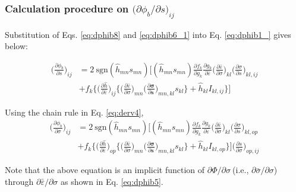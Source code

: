 \documentclass[12pt]{amsart}
\begin{document}
\subsubsection{Calculation procedure on $\big(\partial\phi_b/\partial s\big)_{ij}$}
\label{sec:calc}


Substitution of Eqs. \ref{eq:dphib8} and \ref{eq:dphib6_1} into Eq. \ref{eq:dphib1_} gives below:

\begin{equation}
  \label{eq:dphib_main}
  \begin{split}
    \bigg(\frac{\partial\phi_b}{\partial s}\bigg)_{ij} &= 2\ \text{sgn}(\hat{h}_{mn}s_{mn}) \bigg[(\hat{h}_{mn}s_{mn})
    \frac{\partial f_k}{\partial g_k} \frac{\partial g_k}{\partial \bar{\varepsilon}}
    \bigg(\frac{\partial\bar{\varepsilon}}{\partial\sigma}\bigg)_{kl}
    \bigg(\frac{\partial\sigma}{\partial s}\bigg)_{kl,ij} \\
    &+ f_k\bigg\{
    \bigg(\frac{\partial\hat{h}}{\partial\bar{\varepsilon}}\bigg)_{ij} \bigg\{\bigg(\frac{\partial\bar{\varepsilon}}{\partial\sigma}\bigg)_{mn}  \bigg(\frac{\partial{\mathbf{\sigma}}}{\partial{\mathbf{s}}}\bigg)_{mn,kl} s_{kl}\bigg\} + \hat{h}_{kl}I_{kl,ij}
      \bigg\}
    \bigg]
  \end{split}
\end{equation}

Using the chain rule in Eq. \ref{eq:derv4},
\begin{equation}
  \label{eq:dphib_dsig}
  \begin{split}
    \bigg(\frac{\partial\phi_b}{\partial\sigma}\bigg)_{ij} &=
    2\ \text{sgn}(\hat{h}_{mn}s_{mn}) \bigg[(\hat{h}_{mn}s_{mn})
    \frac{\partial f_k}{\partial g_k} \frac{\partial g_k}{\partial \bar{\varepsilon}}
    \bigg(\frac{\partial\bar{\varepsilon}}{\partial\sigma}\bigg)_{kl}
    \bigg(\frac{\partial\sigma}{\partial s}\bigg)_{kl,op} \\
    &+ f_k\bigg\{
    \bigg(\frac{\partial\hat{h}}{\partial\bar{\varepsilon}}\bigg)_{op} \bigg\{\bigg(\frac{\partial\bar{\varepsilon}}{\partial\sigma}\bigg)_{mn}  \bigg(\frac{\partial \mathbf{\sigma}}{\partial \mathbf{s}}\bigg)_{mn,kl} s_{kl}\bigg\} + \hat{h}_{kl}I_{kl,op}
      \bigg\}
    \bigg] \bigg(\frac{\partial s}{\partial\sigma}\bigg)_{op,ij}
  \end{split}
\end{equation}

Note that the above equation is an implicit function of $\partial\Phi/\partial\sigma\ $(i.e., $\partial\bar{\sigma}/\partial \sigma$) through $\partial\bar{\varepsilon}/\partial\sigma$ as shown in Eq. \ref{eq:dphib5}.
\end{document}
